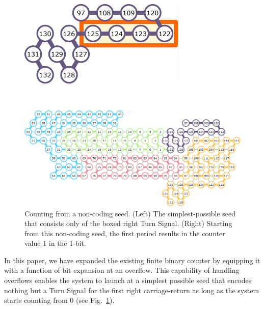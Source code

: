 \documentclass[twocolumn]{svjour3}
\begin{document}
\begin{figure}[tb]

\centering
\begin{minipage}{0.3\linewidth}
\centering
\includegraphics[width=\linewidth]{zeroBit01.pdf}
\end{minipage}
\begin{minipage}{0.05\linewidth}
\ \\
\end{minipage}
\begin{minipage}{0.55\linewidth}
\centering
\includegraphics[width=\linewidth]{zeroBit05.pdf}
\end{minipage}
\caption{Counting from a non-coding seed.
(Left) The simplest-possible seed that consists only of the boxed right Turn Signal. 
(Right) Starting from this non-coding seed, the first period results in the counter value 1 in the 1-bit. 
}
\label{fig:noncoding_seed}
\end{figure}

In this paper, we have expanded the existing finite binary counter by equipping it with a function of bit expansion at an overflow.
This capability of handling overflows enables the system to launch at a simplest possible seed that encodes nothing but a Turn Signal for the first right carriage-return as long as the system starts counting from 0 (see Fig.~\ref{fig:noncoding_seed}). 
\end{document}
